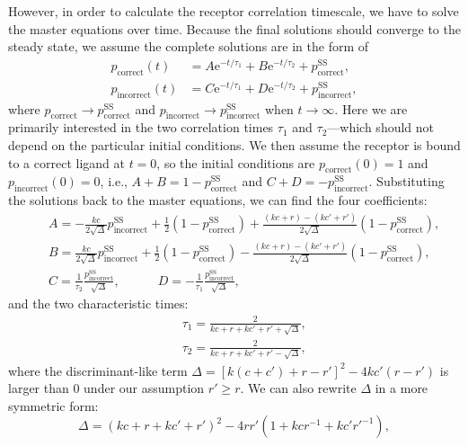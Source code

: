 However, in order to calculate the receptor correlation timescale, we have to solve the master equations over time.
Because the final solutions should converge to the steady state, we assume the complete solutions are in the form of
\begin{align*}
    p_\textrm{correct}(t)&=A\mathrm{e}^{-t/\tau_1}+B\mathrm{e}^{-t/\tau_2}+p_\textrm{correct}^{\textrm{SS}},\\
    p_\textrm{incorrect}(t)&=C\mathrm{e}^{-t/\tau_1}+D\mathrm{e}^{-t/\tau_2}+p_\textrm{incorrect}^{\textrm{SS}},
\end{align*}
where $p_\textrm{correct}\to p_\textrm{correct}^\textrm{SS}$ and $p_\textrm{incorrect}\to p_\textrm{incorrect}^\textrm{SS}$ when $t\to\infty$.
Here we are primarily interested in the two correlation times $\tau_1$ and $\tau_2$---which should not depend on the particular initial conditions.
We then assume the receptor is bound to a correct ligand at $t=0$, so the initial conditions are $p_\textrm{correct}(0)=1$ and $p_\textrm{incorrect}(0)=0$, i.e., $A+B=1-p_\textrm{correct}^{\textrm{SS}}$ and $C+D=-p_\textrm{incorrect}^{\textrm{SS}}$.
Substituting the solutions back to the master equations, we can find the four coefficients:
\begin{eqnarray}
    &&A=-\frac{kc}{2\sqrt{\Delta}}p_\textrm{incorrect}^\textrm{SS}+\frac{1}{2}(1-p_\textrm{correct}^\textrm{SS})+\frac{(kc+r)-(kc'+r')}{2\sqrt{\Delta}}(1-p_\textrm{correct}^\textrm{SS}),\nonumber\\
    &&B=\frac{kc}{2\sqrt{\Delta}}p_\textrm{incorrect}^\textrm{SS}+\frac{1}{2}(1-p_\textrm{correct}^\textrm{SS})-\frac{(kc+r)-(kc'+r')}{2\sqrt{\Delta}}(1-p_\textrm{correct}^\textrm{SS}),\nonumber\\
    &&C=\frac{1}{\tau_2}\frac{p_\textrm{incorrect}^\textrm{SS}}{\sqrt{\Delta}},\qquad\quad D=-\frac{1}{\tau_1}\frac{p_\textrm{incorrect}^\textrm{SS}}{\sqrt{\Delta}},\nonumber
\end{eqnarray}
and the two characteristic times:
\begin{eqnarray}
    &&\tau_1=\frac{2}{kc+r+kc'+r'+\sqrt{\Delta}},\\
    &&\tau_2=\frac{2}{kc+r+kc'+r'-\sqrt{\Delta}},
\end{eqnarray}
where the discriminant-like term $\Delta = [k(c+c')+r-r']^2-4kc'(r-r')$ is larger than $0$ under our assumption $r'\geqslant r$.
We can also rewrite $\Delta$ in a more symmetric form:
\begin{equation*}
    \Delta = {(kc+r+kc'+r')^2-4rr'(1+kcr^{-1}+kc'r'^{-1})},
\end{equation*}
